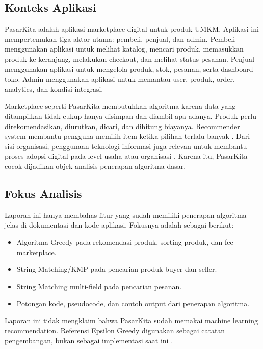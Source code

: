 \subsection{Konteks Aplikasi}

PasarKita adalah aplikasi marketplace digital untuk produk UMKM. Aplikasi ini mempertemukan tiga aktor utama: pembeli, penjual, dan admin. Pembeli menggunakan aplikasi untuk melihat katalog, mencari produk, memasukkan produk ke keranjang, melakukan checkout, dan melihat status pesanan. Penjual menggunakan aplikasi untuk mengelola produk, stok, pesanan, serta dashboard toko. Admin menggunakan aplikasi untuk memantau user, produk, order, analytics, dan kondisi integrasi.

Marketplace seperti PasarKita membutuhkan algoritma karena data yang ditampilkan tidak cukup hanya disimpan dan diambil apa adanya. Produk perlu direkomendasikan, diurutkan, dicari, dan dihitung biayanya. Recommender system membantu pengguna memilih item ketika pilihan terlalu banyak \parencite{Resnick1997}. Dari sisi organisasi, penggunaan teknologi informasi juga relevan untuk membantu proses adopsi digital pada level usaha atau organisasi \parencite{Oliveira2011}. Karena itu, PasarKita cocok dijadikan objek analisis penerapan algoritma dasar.

\subsection{Fokus Analisis}

Laporan ini hanya membahas fitur yang sudah memiliki penerapan algoritma jelas di dokumentasi dan kode aplikasi. Fokusnya adalah sebagai berikut:

\begin{itemize}[leftmargin=*]
    \item Algoritma Greedy pada rekomendasi produk, sorting produk, dan fee marketplace.
    \item String Matching/KMP pada pencarian produk buyer dan seller.
    \item String Matching multi-field pada pencarian pesanan.
    \item Potongan kode, pseudocode, dan contoh output dari penerapan algoritma.
\end{itemize}

Laporan ini tidak mengklaim bahwa PasarKita sudah memakai machine learning recommendation. Referensi Epsilon Greedy digunakan sebagai catatan pengembangan, bukan sebagai implementasi saat ini \parencite{Umami2021}.

